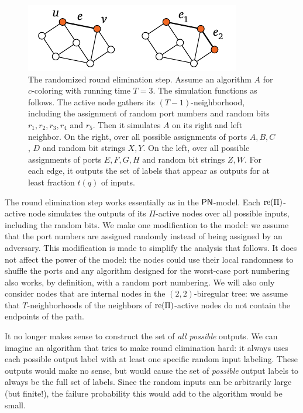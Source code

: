\begin{figure}
	\centering
	\includegraphics[page=\PRandomizedRE,scale=0.4]{figs.pdf}
	\caption{The randomized round elimination step. Assume an algorithm $A$ for $c$-coloring with running time $T = 3$. The simulation functions as follows. The active node gathers its $(T-1)$-neighborhood, including the assignment of random port numbers and random bits $r_1, r_2, r_3, r_4$ and $r_5$. Then it simulates $A$ on its right and left neighbor. On the right, over all possible assignments of ports $A, B, C$, $D$ and random bit strings $X, Y$. On the left, over all possible assignments of ports $E,F,G,H$ and random bit strings $Z,W$. For each edge, it outputs the set of labels that appear as outputs for at least fraction $t(q)$ of inputs.} \label{fig:rand-re}
\end{figure}

The round elimination step works essentially as in the $\textup{\sffamily PN}$-model. Each $\operatorname{re}(\Pi)$-active node simulates the outputs of its $\Pi$-active nodes over all possible inputs, including the random bits. We make one modification to the model: we assume that the port numbers are assigned randomly instead of being assigned by an adversary. This modification is made to simplify the analysis that follows. It does not affect the power of the model: the nodes could use their local randomness to shuffle the ports and any algorithm designed for the worst-case port numbering also works, by definition, with a random port numbering. We will also only consider nodes that are internal nodes in the $(2,2)$-biregular tree: we assume that $T$-neighborhoods of the neighbors of $\operatorname{re}(\Pi)$-active nodes do not contain the endpoints of the path.

It no longer makes sense to construct the set of \emph{all possible} outputs. We can imagine an algorithm that tries to make round elimination hard: it always uses each possible output label with at least one specific random input labeling. These outputs would make no sense, but would cause the set of \emph{possible} output labels to always be the full set of labels. Since the random inputs can be arbitrarily large (but finite!), the failure probability this would add to the algorithm would be small.

